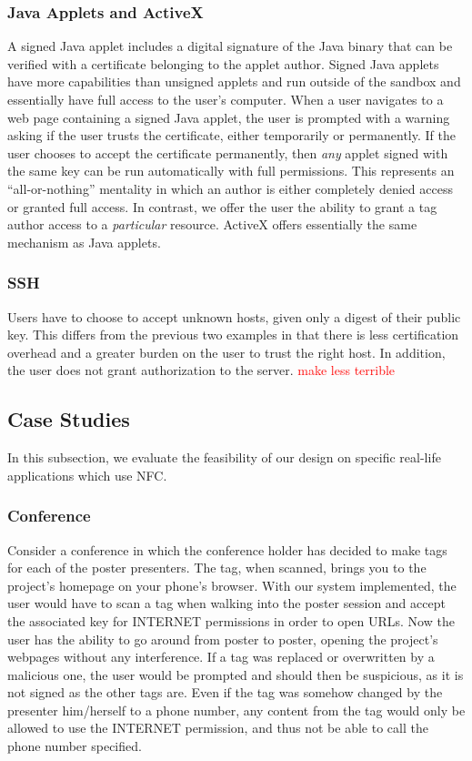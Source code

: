 \documentclass[12pt]{article}
\newcommand\TODO[1]{\textcolor{red}{#1}}
\begin{document}
\subsubsection{Java Applets and ActiveX}
A signed Java applet includes a digital signature of the Java binary that can be verified with a certificate belonging to the applet author.
Signed Java applets have more capabilities than unsigned applets and run outside of the sandbox and essentially have full access to the user's computer.
When a user navigates to a web page containing a signed Java applet, the user is prompted with a warning asking if the user trusts the certificate, either temporarily or permanently.
If the user chooses to accept the certificate permanently, then \textit{any} applet signed with the same key can be run automatically with full permissions.
This represents an ``all-or-nothing'' mentality in which an author is either completely denied access or granted full access.
In contrast, we offer the user the ability to grant a tag author access to a \textit{particular} resource.
ActiveX offers essentially the same mechanism as Java applets.

\subsubsection{SSH}
Users have to choose to accept unknown hosts, given only a digest of their public key.
This differs from the previous two examples in that there is less certification overhead and a greater burden on the user to trust the right host.
In addition, the user does not grant authorization to the server.
\TODO{make less terrible}

\subsection{Case Studies}
In this subsection, we evaluate the feasibility of our design on specific real-life applications which use NFC.

\subsubsection{Conference}
Consider a conference in which the conference holder has decided to make tags for each of the poster presenters. The tag, when scanned, brings you to the project’s homepage on your phone’s browser. With our system implemented, the user would have to scan a tag when walking into the poster session and accept the associated key for INTERNET permissions in order to open URLs. Now the user has the ability to go around from poster to poster, opening the project’s webpages without any interference. If a tag was replaced or overwritten by a malicious one, the user would be prompted and should then be suspicious, as it is not signed as the other tags are. Even if the tag was somehow changed by the presenter him/herself to a phone number, any content from the tag would only be allowed to use the INTERNET permission, and thus not be able to call the phone number specified. 
\end{document}
